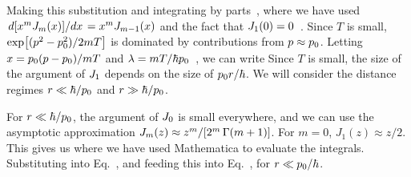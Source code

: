 \documentclass[11pt]{article}
\begin{document}
{	Making this substitution and integrating by parts~\cite[p.~358]{Landau2},
	where we have used $\dv*{[ x^m J_m(x) ]}{x} = x^m J_{m - 1}(x)$ and the fact that $J_1(0) = 0$~\cite{Bessel}.  Since $T$ is small, $\exp[ (p^2 - p_0^2) / 2mT ]$ is dominated by contributions from $p \approx p_0$.  Letting $x = p_0 (p - p_0) / m T$ and $\lambda = m T / \hbar p_0$~\cite[p.~358]{Landau2}, we can write
	Since $T$ is small, the size of the argument of $J_1$ depends on the size of $p_0 r / \hbar$.  We will consider the distance regimes $r \ll \hbar / p_0$ and $r \gg \hbar / p_0$.
	
	For $r \ll \hbar / p_0$, the argument of $J_0$ is small everywhere, and we can use the asymptotic approximation $J_m(z) \approx z^m / [ 2^m \,\Gamma(m + 1) ]$.  For $m = 0$, $J_1(z) \approx z / 2$.  This gives us
	where we have used Mathematica to evaluate the integrals.  Substituting into Eq.~,
	and feeding this into Eq.~,
	for $r \ll p_0 / \hbar$.
	
}
\end{document}
